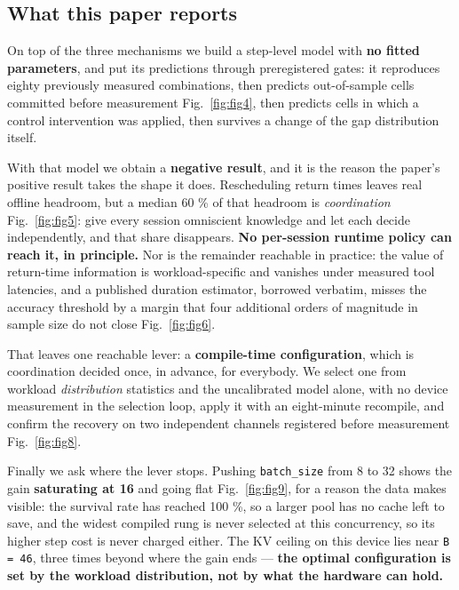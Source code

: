\subsection{What this paper reports}

On top of the three mechanisms we build a step-level model with \textbf{no fitted parameters}, and put its predictions through preregistered gates: it reproduces eighty previously measured combinations, then predicts out-of-sample cells committed before measurement Fig.~\ref{fig:fig4}, then predicts cells in which a control intervention was applied, then survives a change of the gap distribution itself.

With that model we obtain a \textbf{negative result}, and it is the reason the paper's positive result takes the shape it does. Rescheduling return times leaves real offline headroom, but a median 60 \% of that headroom is \emph{coordination} Fig.~\ref{fig:fig5}: give every session omniscient knowledge and let each decide independently, and that share disappears. \textbf{No per-session runtime policy can reach it, in principle.} Nor is the remainder reachable in practice: the value of return-time information is workload-specific and vanishes under measured tool latencies, and a published duration estimator, borrowed verbatim, misses the accuracy threshold by a margin that four additional orders of magnitude in sample size do not close Fig.~\ref{fig:fig6}.

That leaves one reachable lever: a \textbf{compile-time configuration}, which is coordination decided once, in advance, for everybody. We select one from workload \emph{distribution} statistics and the uncalibrated model alone, with no device measurement in the selection loop, apply it with an eight-minute recompile, and confirm the recovery on two independent channels registered before measurement Fig.~\ref{fig:fig8}.

Finally we ask where the lever stops. Pushing \texttt{batch\_size} from 8 to 32 shows the gain \textbf{saturating at 16} and going flat Fig.~\ref{fig:fig9}, for a reason the data makes visible: the survival rate has reached 100 \%, so a larger pool has no cache left to save, and the widest compiled rung is never selected at this concurrency, so its higher step cost is never charged either. The KV ceiling on this device lies near \texttt{B = 46}, three times beyond where the gain ends --- \textbf{the optimal configuration is set by the workload distribution, not by what the hardware can hold.}


